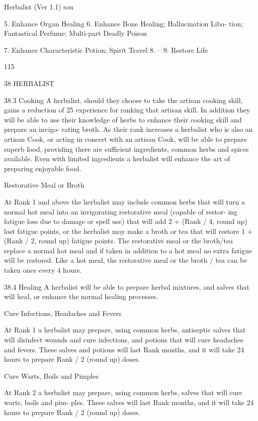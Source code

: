 \begin{Chapter}{Herbalist (Ver 1.1)}
son 

5.   Enhance Organ Healing 
6.   Enhance Bone Healing; Hallucination Liba-
tion; Fantastical Perfume; Multi-part Deadly 
Poison 

7.   Enhance Characteristic Potion; Spirit Travel 
8.   – 
9.   Restore Life 

115 

38 HERBALIST 

38.3 Cooking 
A  herbalist,  should  they  choose  to  take  the  artisan 
cooking  skill,  gains  a  reduction  of  25%
experience for ranking that artisan skill. In addition 
they will be able to use their knowledge of herbs to 
enhance their cooking skill and prepare an invigo-
rating  broth.  As  their  rank  increases  a  herbalist 
who  is  also  an  artisan  Cook,  or  acting  in  concert 
with an artisan Cook, will be able to prepare superb 
food,  providing  there  are  sufficient  ingredients, 
common  herbs  and  spices  available.  Even  with 
limited ingredients a  herbalist  will  enhance  the  art 
of preparing enjoyable food. 

Restorative Meal or Broth 

At  Rank  1  and  above  the  herbalist  may  include 
common herbs that will turn a normal hot meal into 
an invigorating restorative meal (capable of restor-
ing  fatigue  loss  due  to  damage  or  spell  use)  that 
will  add  2  +  (Rank  /  4,  round  up)  lost  fatigue 
points, or the herbalist may make a broth or tea that 
will restore 1 + (Rank / 2, round up) fatigue points. 
The  restorative  meal  or  the  broth/tea  replace  a 
normal  hot  meal  and  if  taken  in  addition  to  a  hot 
meal  no  extra  fatigue  will  be  restored.  Like  a  hot 
meal, the restorative meal or the broth / tea can be 
taken once every 4 hours. 

38.4 Healing 
A herbalist will be able to prepare herbal mixtures, 
and  salves  that  will  heal,  or  enhance  the  normal 
healing processes. 

Cure Infections, Headaches and Fevers 

At Rank 1 a herbalist may prepare, using common 
herbs,  antiseptic  salves  that  will  disinfect  wounds 
and  cure  infections,  and  potions  that  will  cure 
headaches  and  fevers.  These  salves  and  potions 
will last Rank months, and it will take 24 hours to 
prepare Rank / 2 (round up) doses. 

Cure Warts, Boils and Pimples 

At Rank 2 a herbalist may prepare, using common 
herbs,  salves  that  will  cure  warts,  boils  and  pim-
ples.  These  salves  will  last  Rank  months,  and  it 
will  take  24  hours  to  prepare  Rank  /  2  (round  up) 
doses. 


\end{Chapter}
